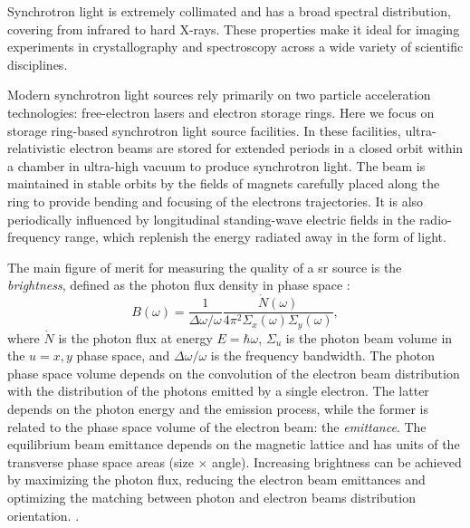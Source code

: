 Synchrotron light is extremely collimated and has a broad spectral distribution, covering from infrared to hard X-rays. These properties make it ideal for imaging experiments in crystallography and spectroscopy across a wide variety of scientific disciplines.

Modern synchrotron light sources rely primarily on two particle acceleration technologies: free-electron lasers and electron storage rings. Here we focus on storage ring-based synchrotron light source facilities. In these facilities, ultra-relativistic electron beams are stored for extended periods in a closed orbit within a chamber in ultra-high vacuum to produce synchrotron light. The beam is maintained in stable orbits by the fields of magnets carefully placed along the ring to provide bending and focusing of the electrons trajectories. It is also periodically influenced by longitudinal standing-wave electric fields in the radio-frequency range, which replenish the energy radiated away in the form of light.

The main figure of merit for measuring the quality of a \gls*{sr} source is the \textit{brightness}\cite{huang_brightness_2013}, defined as the photon flux density in phase space \cite{hettel_challenges_2014,wiedemann_particle_2015}:
\begin{equation}
    B(\omega) = \frac{1}{\Delta \omega/\omega}\frac{\dot{N}(\omega)}{4\pi^2\Sigma_{x}(\omega)\Sigma_{y}(\omega)},
\end{equation}
where $\dot{N}$ is the photon flux at energy $E=\hbar\omega$, $\Sigma_{u}$ is the photon beam volume in the $u=x,y$ phase space, and $\Delta\omega/\omega$ is the frequency bandwidth. The photon phase space volume depends on the convolution of the electron beam distribution with the distribution of the photons emitted by a single electron. The latter depends on the photon energy and the emission process, while the former is related to the phase space volume of the electron beam: the \textit{emittance}. The equilibrium beam emittance depends on the magnetic lattice and has units of the transverse phase space areas (size $\times$ angle). Increasing brightness can be achieved by maximizing the photon flux, reducing the electron beam emittances and optimizing the matching between photon and electron beams distribution orientation. \cite{wiedemann_particle_2015}.

